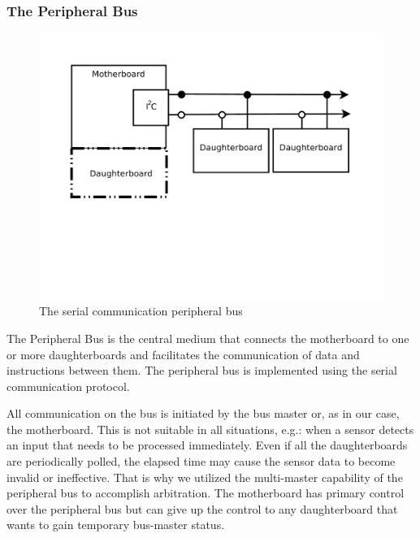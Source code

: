 	
	\subsubsection{The Peripheral Bus} %
	\label{ssub:the_peripheral_bus}
	
	\begin{figure}[h]
	  \begin{center}
	    \includegraphics[width=1.0\columnwidth]{Figures/pbus.pdf}
	    \caption{The serial communication peripheral \iic bus}
	  \end{center}
	\end{figure}
	
	The Peripheral Bus is the central medium that connects the motherboard to one or more daughterboards and facilitates the communication of data and instructions between them. The peripheral bus is implemented using the \iic serial communication protocol. 
	
	All communication on the \iic bus is initiated by the bus master or, as in our case, the motherboard. This is not suitable in all situations, e.g.: when a sensor detects an input that needs to be processed immediately. Even if all the daughterboards are periodically polled, the elapsed time may cause the sensor data to become invalid or ineffective. That is why we utilized the multi-master capability of the \iic peripheral bus to accomplish arbitration. The motherboard has primary control over the peripheral bus but can give up the control to any daughterboard that wants to gain temporary bus-master status. 

